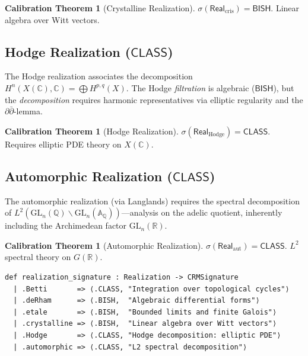 \documentclass[11pt,a4paper]{article}
\theoremstyle{plain}
\theoremstyle{definition}
\newtheorem{calibration}[theorem]{Calibration Theorem}
\newcommand{\BISH}{\textsf{BISH}}
\newcommand{\CLASS}{\textsf{CLASS}}
\newcommand{\Real}{\mathsf{Real}}
\newcommand{\sig}{\sigma}
\newcommand{\Q}{\mathbb{Q}}
\newcommand{\R}{\mathbb{R}}
\newcommand{\C}{\mathbb{C}}
\newcommand{\A}{\mathbb{A}}
\newcommand{\GL}{\mathrm{GL}}
\begin{document}
\begin{calibration}[Crystalline Realization]\label{cal:crys}
$\sig(\Real_{\mathrm{cris}}) = \BISH$. Linear algebra over Witt vectors.
\end{calibration}

\subsection{Hodge Realization ($\CLASS$)}

The Hodge realization associates the decomposition $H^n(X(\C), \C) = \bigoplus H^{p,q}(X)$. The Hodge \emph{filtration} is algebraic ($\BISH$), but the \emph{decomposition} requires harmonic representatives via elliptic regularity and the $\partial\bar\partial$-lemma.

\begin{calibration}[Hodge Realization]\label{cal:hodge}
$\sig(\Real_{\mathrm{Hodge}}) = \CLASS$. Requires elliptic PDE theory on $X(\C)$.
\end{calibration}

\subsection{Automorphic Realization ($\CLASS$)}

The automorphic realization (via Langlands) requires the spectral decomposition of $L^2(\GL_n(\Q)\backslash\GL_n(\A_\Q))$---analysis on the adelic quotient, inherently including the Archimedean factor $\GL_n(\R)$.

\begin{calibration}[Automorphic Realization]\label{cal:auto}
$\sig(\Real_{\mathrm{aut}}) = \CLASS$. $L^2$ spectral theory on $G(\R)$.
\end{calibration}

\begin{tcolorbox}[leanbox={Lean: Realization signatures}]
\begin{Verbatim}[fontsize=\small]
def realization_signature : Realization -> CRMSignature
  | .Betti       => ⟨.CLASS, "Integration over topological cycles"⟩
  | .deRham      => ⟨.BISH,  "Algebraic differential forms"⟩
  | .etale       => ⟨.BISH,  "Bounded limits and finite Galois"⟩
  | .crystalline => ⟨.BISH,  "Linear algebra over Witt vectors"⟩
  | .Hodge       => ⟨.CLASS, "Hodge decomposition: elliptic PDE"⟩
  | .automorphic => ⟨.CLASS, "L2 spectral decomposition"⟩
\end{Verbatim}
\end{tcolorbox}
\end{document}

